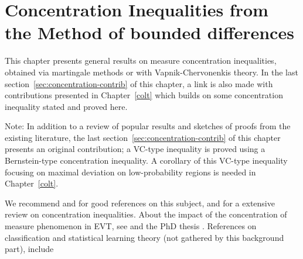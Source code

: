 
\chapter{Concentration Inequalities from the Method of bounded differences}
\label{chap:back_concentration}
\begin{chapabstract}
This chapter presents general results on measure concentration inequalities, obtained via martingale methods or with Vapnik-Chervonenkis theory. In the last section~\ref{sec:concentration-contrib} of this chapter, a link is also made with contributions presented in Chapter~\ref{colt} which builds on some concentration inequality stated and proved here.
\end{chapabstract}

Note: 
In addition to a review of popular results and sketches of proofs from the existing literature, the last section~\ref{sec:concentration-contrib} of this chapter presents an original contribution;
a VC-type inequality is proved using a Bernstein-type concentration inequality. A corollary of this VC-type inequality focusing on maximal deviation on low-probability regions is needed in Chapter~\ref{colt}.

We recommend \cite{McDiarmid98} and \cite{Janson2002} for good references on this subject, and \cite{Massart2007, BLM2013} for a extensive review on concentration inequalities.
%
About the impact of the concentration of measure phenomenon in EVT, see \cite{Boucheron2012, Boucheron2015} and the PhD thesis \cite{ThomasMaud2015}.
%
References on classification and statistical learning theory (not gathered by this background part), include \cite{Vapnik74, Devroye96, Bousquet04, BBL05, Bishop2006, Friedman2001, Vapnik2013} 






